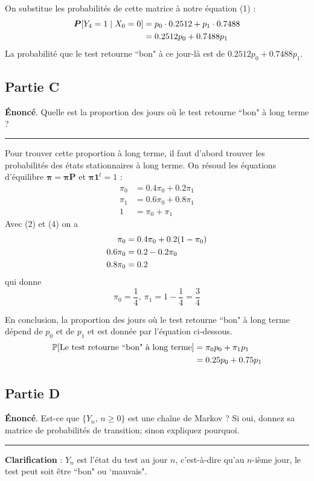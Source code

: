 \documentclass{article}
\begin{document}
On substitue les probabilités de cette matrice à notre équation (1) :
\begin{align}
    \boldsymbol{P}[Y_4=1\mid X_0=0]&=p_0\cdot0.2512+p_1\cdot0.7488 \notag \\
    &=0.2512p_0+0.7488p_1 \notag
\end{align}
La probabilité que le test retourne ``bon" à ce jour-là est de $0.2512p_0+0.7488p_1$.

\newpage
\subsection*{Partie C}
\textbf{Énoncé}. Quelle est la proportion des jours où le test retourne
``bon" à long terme ?
\vspace{.2cm}
\hrule
\vspace{.4cm}
Pour trouver cette proportion à long terme, il faut d'abord trouver les 
probabilités des états stationnaires à long terme. On résoud les équations
d'équilibre $\boldsymbol{\pi}=\boldsymbol{\pi}\boldsymbol{P}$ et
$\boldsymbol{\pi}\boldsymbol{1}^t=1$ :
\begin{align}
    \pi_0&=0.4\pi_0+0.2\pi_1 \\
    \pi_1&=0.6\pi_0+0.8\pi_1 \\
    1&=\pi_0+\pi_1
\end{align}
Avec (2) et (4) on a
\begin{align}
    \pi_0&=0.4\pi_0+0.2(1-\pi_0) \notag \\
    0.6\pi_0&=0.2-0.2\pi_0 \notag \\
    0.8\pi_0&=0.2 \notag 
\end{align}
qui donne
\[
    \pi_0=\frac{1}{4},\ \pi_1=1-\frac{1}{4}=\frac{3}{4} 
\]

\vspace{.3cm}
En conclusion, la proportion des jours où le test retourne ``bon" à long 
terme dépend de $p_0$ et de $p_1$ et est donnée par l'équation ci-dessous.
\begin{align}
    \mathbb{P}[\text{Le test retourne ``bon" à long terme}]&=\pi_0p_0+\pi_1p_1 \notag \\
    &=0.25p_0+0.75p_1 \notag
\end{align}

\newpage
\subsection*{Partie D}
\textbf{Énoncé}. Est-ce que $\{Y_n,\,n\ge0\}$ est une chaîne de Markov ?
Si oui, donnez sa matrice de probabilités de transition; sinon expliquez
pourquoi.
\vspace{.2cm}
\hrule
\vspace{.4cm}
\noindent \textbf{Clarification} : $Y_n$ est l'état du test au jour $n$, c'est-à-dire qu'au $n$-ième jour, 
le test peut soit être ``bon" ou `mauvais". \\
\end{document}
